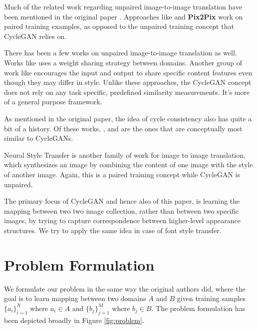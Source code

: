 \documentclass[10pt,twocolumn,letterpaper]{article}
\begin{document}
Much of the related work regarding unpaired image-to-image translation have been mentioned in the 
original paper \cite{cyclegan}. Approaches like \cite{rel3, rel6, rel11, rel12} and \textbf{Pix2Pix} work on 
paired training examples, as opposed to the unpaired training concept that CycleGAN relies on.

There has been a few works on unpaired image-to-image translation as well. Works like \cite{rel13, rel14, 
rel15} uses a weight sharing strategy between domains. Another group of work like \cite{rel16, rel17, rel18} 
encourages the input and output to share specific content features even though they may differ in style. 
Unlike these approaches, the CycleGAN concept does not rely on any task specific, predefined similarity 
measurements. It's more of a general purpose framework.

As mentioned in the original paper, the idea of cycle consistency also has quite a bit of a history. Of these 
works, \cite{rel19}, \cite{rel20} and \cite{21} are the ones that are conceptually most similar to 
CycleGANs.

Neural Style Transfer \cite{rel4, rel22, rel23} is another family of work for image to image translation, 
which synthesizes an image by combining the content of one image with the style of another image. 
Again, this is a paired training concept while CycleGAN is unpaired.

The primary focus of CycleGAN and hence also of this paper, is learning the mapping between two two image collection, rather than between two specific images, by trying to capture correspondence between higher-level appearance structures. We try to apply the same idea in case of font style transfer.

\section{Problem Formulation}

We formulate our problem in the same way the original authors \cite{cyclegan} did, where the goal is to 
learn mapping between two domains $A$ and $B$ given training samples $\{a_i\}_{i=1}^N$ where $a_i \in 
A$ and $\{b_j\}_{j=1}^M$ where $b_j \in B$. The problem formulation has been depicted broadly in Figure 
\ref{fig:problem}.
\end{document}

